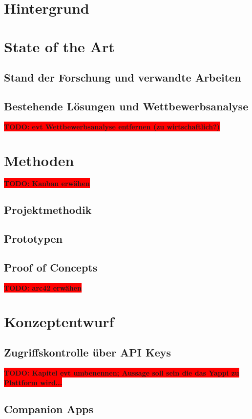 \documentclass[12pt,a4paper]{report}
\newcommand{\todo}[1]{\colorbox{red}{\textbf{TODO: #1}}\\}
\begin{document}
\chapter{Hintergrund}
\chapter{State of the Art}
\section{Stand der Forschung und verwandte Arbeiten}
\section{Bestehende Lösungen und Wettbewerbsanalyse}

\todo{evt Wettbewerbsanalyse entfernen (zu wirtschaftlich?)}

\chapter{Methoden}

\todo{Kanban erwähen}

\section{Projektmethodik}
\section{Prototypen}
\section{Proof of Concepts}

\todo{arc42 erwähen}

\chapter{Konzeptentwurf}
\section{Zugriffskontrolle über API Keys}

\todo{Kapitel evt umbenennen; Aussage soll sein die das Yappi zu Plattform wird...}

\section{Companion Apps}
\end{document}
